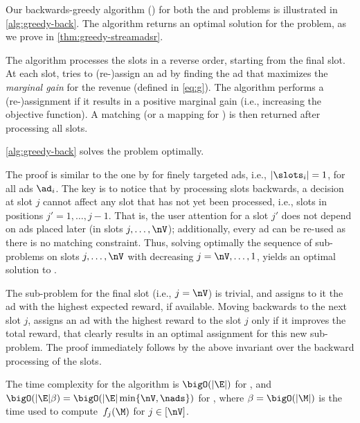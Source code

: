 Our  backwards-greedy algorithm (\alggback) 
for both the \streamadsr and \streamads problems
is illustrated in \cref{alg:greedy-back}.
The \alggback algorithm returns an optimal solution for the \streamadsr problem, 
as we prove in \cref{thm:greedy-streamadsr}.

The \alggback algorithm processes the slots in a reverse order, starting from the final slot.
At each slot, \alggback tries to (re-)assign an ad
by finding the ad that maximizes the \emph{marginal gain} for the revenue (defined in \cref{eq:g}).
The algorithm performs a (re-)assignment if it results in a positive marginal gain (i.e., increasing the objective function).
A matching (or a mapping for \streamadsr) is then returned after processing all slots.

\begin{theoremE}\label{thm:greedy-streamadsr}
\cref{alg:greedy-back} solves the \streamadsr problem optimally.
\end{theoremE}
\begin{proofE}
	The proof is similar to the one by \citet{ieong2014advertising} 
	for finely targeted ads, i.e., $|\slots_i| = 1$, for all ads $\ad_i$.
	The key is to notice that by processing slots backwards, 
	a decision 
	at slot $j$
	cannot affect any slot 
	that has not yet been processed, i.e., slots in positions $j'=1,\dots,j-1$.
	That is, the user attention for a slot $j'$ does not depend on ads placed later (in slots $j,\dots,\nV$);
	additionally, 
	every ad can be re-used as there is no matching constraint.
	Thus, 
	solving optimally the sequence of sub-problems on slots $j,\dots,\nV$ 
	with decreasing $j=\nV,\dots,1$,
	yields an optimal solution to \streamadsr.
	
	The sub-problem for the final slot (i.e., $j=\nV$) is trivial, 
	and \alggback assigns to it the ad with the highest expected reward, 
	if available.
	Moving backwards to the next slot $j$, 
	\alggback assigns an ad with the highest reward to the slot $j$ only if it improves the total reward,
	that clearly
	results in an optimal assignment for this new sub-problem. %
	The proof immediately follows by the above invariant over the backward processing of the slots. 
\end{proofE}

The time complexity for the \alggback algorithm is 
$\bigO(|\E|)$ for \streamadsr, and
$\bigO(|\E| \beta) = \bigO(|\E| \min \{ \nV, \nads \})$ for \streamads,
where $\beta = \bigO(|\M|)$ is the time used to compute~$f_j(\M)$ for $j\in [\nV]$.
